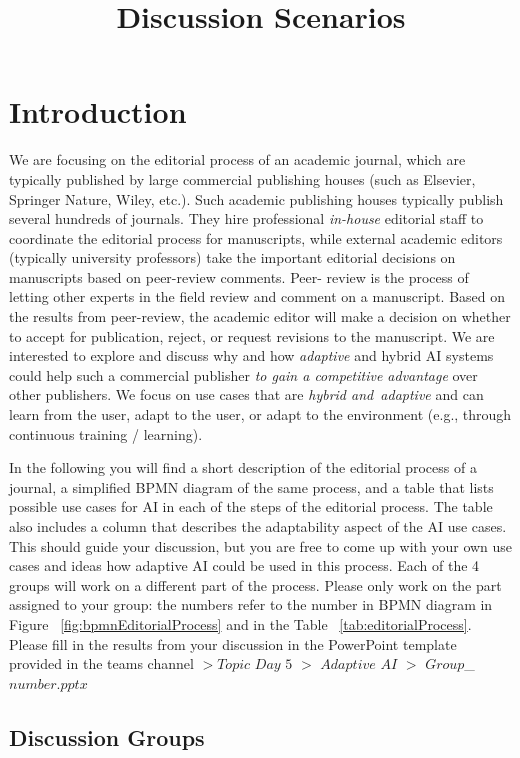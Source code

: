 \documentclass{article}
\title{Discussion Scenarios}
\begin{document}
\maketitle

\section{Introduction}

We are focusing on the editorial process of an academic journal, which are typically published by large commercial publishing houses
(such as Elsevier, Springer Nature, Wiley, etc.). Such academic publishing houses typically publish several hundreds of journals.
They hire professional \textit{in-house} editorial staff to coordinate the editorial process for manuscripts, while external academic
editors (typically university professors) take the important editorial decisions on manuscripts based on peer-review comments. Peer-
review is the process of letting other experts in the field review and comment on a manuscript. Based on the results from peer-review,
the academic editor will make a decision on whether to accept for publication, reject, or request revisions to the manuscript. 
We are interested to explore and discuss why and how \textit{adaptive} and hybrid AI systems could help such a commercial publisher
\textit{to gain a competitive advantage} over other publishers. We focus on use cases that are \textit{hybrid and adaptive} and can
learn from the user, adapt to the user, or adapt to the environment (e.g., through continuous training / learning).

In the following you will find a short description of the editorial process of a journal, a simplified BPMN diagram of the same 
process, and a table that lists possible use cases for AI in each of the steps of the editorial process. The table also includes
a column that describes the adaptability aspect of the AI use cases. This should guide your discussion, but you are free to
come up with your own use cases and ideas how adaptive AI could be used in this process. Each of the 4 groups will work on a
different part of the process. Please only work on the part assigned to your group: the numbers refer to the number in BPMN diagram
in Figure ~\ref{fig:bpmnEditorialProcess} and in the Table ~\ref{tab:editorialProcess}. Please fill in the results from your
discussion in the PowerPoint template provided in the teams channel $> Topic$ $Day$ $5$ $>$ $Adaptive$ $AI$ $>$ $Group$\_$number.pptx$

\subsection{Discussion Groups}
\end{document}
